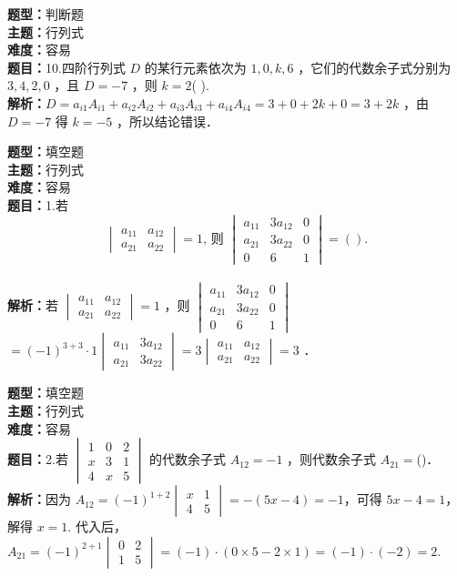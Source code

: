 \documentclass{ctexart}
\newenvironment{question}[5]{%
	\noindent\textbf{题型：}#1\\
	\textbf{主题：}#2\\
	\textbf{难度：}#3\\
	\textbf{题目：}#4\\
	\textbf{解析：}#5\\
	\vspace{1em}
}{}
\begin{document}
	\begin{question}
		{判断题}
		{行列式}
		{容易}
		{10.四阶行列式 \(D\) 的某行元素依次为 \(1,0,k,6\) ，它们的代数余子式分别为 \(3,4,2,0\) ，且 \(D=-7\) ，则 \(k=2\)(  ).}
		{\(D=a_{i1} A_{i1}+a_{i2} A_{i2}+a_{i3} A_{i3}+a_{i4} A_{i4}=3+0+2k+0=3+2k\) ，由 \(D=-7\) 得 \(k=-5\) ，所以结论错误．}
	\end{question}
	
	\begin{question}
		{填空题}
		{行列式}
		{容易}
		{1.若
			\[
			\begin{vmatrix}
				a_{11} & a_{12} \\
				a_{21} & a_{22}
			\end{vmatrix}=1 \text {, 则 }\begin{vmatrix}
				a_{11} & 3 a_{12} & 0 \\
				a_{21} & 3 a_{22} & 0 \\
				0 & 6 & 1
			\end{vmatrix}= ( ).
			\]}
		{若 \(\begin{vmatrix}a_{11} & a_{12} \\ a_{21} & a_{22}\end{vmatrix}=1\) ，则 \(\begin{vmatrix}a_{11} & 3 a_{12} & 0 \\ a_{21} & 3 a_{22} & 0 \\ 0 & 6 & 1\end{vmatrix}\) \(=(-1)^{3+3} \cdot 1\begin{vmatrix}a_{11} & 3 a_{12} \\ a_{21} & 3 a_{22}\end{vmatrix}=3\begin{vmatrix}a_{11} & a_{12} \\ a_{21} & a_{22}\end{vmatrix}=3\) ．} 
	\end{question}
	
	
	\begin{question}
		{填空题}
		{行列式}
		{容易}
		{2.若 \(\begin{vmatrix}1 & 0 & 2 \\ x & 3 & 1 \\ 4 & x & 5\end{vmatrix}\) 的代数余子式 \(A_{12}=-1\) ，则代数余子式 \(A_{21}=\)(\qquad)．}
		{因为 \(A_{12}=(-1)^{1+2}\begin{vmatrix}x & 1 \\ 4 & 5\end{vmatrix}=-(5x-4)=-1\)，可得 \(5x-4=1\)，解得 \(x=1\). 代入后，\(A_{21}=(-1)^{2+1}\begin{vmatrix}0 & 2 \\ 1 & 5\end{vmatrix}=(-1)\cdot(0\times5 - 2\times1) = (-1)\cdot(-2)=2\). }
	\end{question}
	
\end{document}
